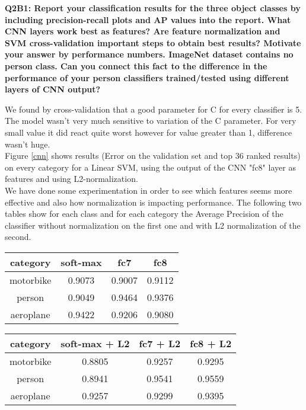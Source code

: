 \documentclass[a4paper,11pt]{exam}
\begin{document}
\textbf{Q2B1: Report your classification results for the three object classes by including precision-recall plots and AP values into the report. What CNN layers work best as features? Are feature normalization and SVM cross-validation important steps to obtain best results? Motivate your answer by performance numbers. ImageNet dataset contains no person class. Can you connect this fact to the difference in the performance of your person classifiers trained/tested using different layers of CNN output?\\}

We found by cross-validation that a good parameter for C for every classifier is 5. The model wasn't very much sensitive to variation of the C parameter. For very small value it did react quite worst however for value greater than 1, difference wasn't huge. \\

Figure \ref{cnn} shows results (Error on the validation set and top 36 ranked results) on every category for a Linear SVM, using the output of the CNN "fc8" layer as features and using L2-normalization.\\

We have done some experimentation in order to see which features seems more effective and also how normalization is impacting performance. The following two tables show for each class and for each category the Average Precision of the classifier without normalization on the first one and with L2 normalization of the second.

\begin{center}
\begin{tabular}{ c | c | c |  c }
	category & soft-max & fc7 & fc8 \\
	\hline
	   motorbike &  0.9073 & 0.9007 & 0.9112 \\
	   person  & 0.9049 & 0.9464 & 0.9376 \\
	   aeroplane &  0.9422 & 0.9206 & 0.9080 \\
	 \hline
\end{tabular}
\end{center}


\begin{center}
\begin{tabular}{ c | c | c |  c }
	category & soft-max + L2 & fc7 + L2 & fc8 + L2 \\
	\hline
	   motorbike &  0.8805 & 0.9257 & 0.9295 \\
	   person  & 0.8941  &  0.9541  & 0.9559 \\
	   aeroplane &  0.9257  &  0.9299  &  0.9395 \\
	 \hline
\end{tabular}
\end{center}
\end{document}
